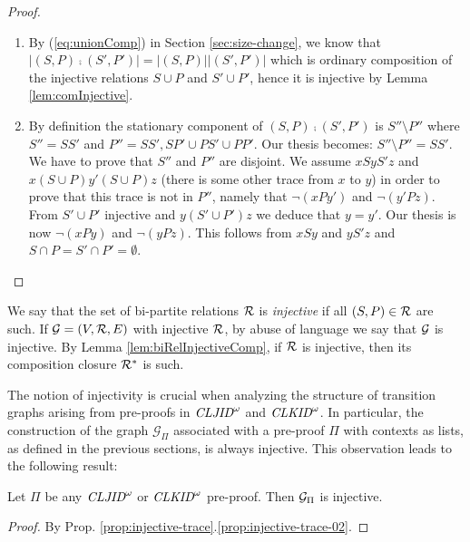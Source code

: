 \begin{proof}
\begin{enumerate}
\item
By (\ref{eq:unionComp}) in Section \ref{sec:size-change},  we know that $|(S,P) \comp (S',P')| =  |(S,P)| |(S',P')|$ which is ordinary composition of the injective relations $S \cup P$ and $S' \cup P'$, hence it is injective by Lemma \ref{lem:comInjective}.

\item
By definition the stationary component of $(S,P) \comp (S',P')$ is $S'' \setminus P''$
where $S'' =S S'$ and $P'' = SS', SP' \cup PS' \cup PP'$. Our thesis becomes:
$S'' \setminus P'' = S S'$. We have to prove that $S''$ and $P''$ are disjoint. 
We assume $xSyS'z$ and $x (S \cup P) y' (S \cup P) z$ 
(there is some other trace from $x$ to $y$) 
in order to prove that this trace is not in $P''$, namely that
$\neg (x P  y')$ and $\neg (y' P  z)$.  From $S' \cup P'$ injective and $y (S' \cup P') z$
we deduce that $y = y'$. Our thesis is now $\neg (x P  y)$ and $\neg (y P  z)$.
This follows from $xSy$ and $yS'z$ and $S \cap P = S' \cap P' = \emptyset$.
\end{enumerate}
\end{proof}


We say that the set of bi-partite relations $\mathcal{R}$ is {\em injective} if all $(S,P) \in \mathcal{R}$ are such. If $\mathcal{G} = (V, \mathcal{R}, E)$ with injective $\mathcal{R}$, by abuse of language we say that $\mathcal{G}$ is injective. By Lemma \ref{lem:biRelInjectiveComp}, if $\mathcal{R}$ is injective, then its composition closure $\mathcal{R}^*$ is such. 

The notion of injectivity is crucial when analyzing the structure of transition graphs arising from pre-proofs in $\textit{CLJID}^\omega$ and $\textit{CLKID}^\omega$. In particular, the construction of the graph $\mathcal{G}_{\Pi}$ associated with a pre-proof $\Pi$ with contexts as lists, as defined in the previous sections, is always injective. 
This observation leads to the following result:

\begin{theorem}\label{thr:injective-pre-proofs}
Let $\Pi$ be any $\textit{CLJID}^\omega$ or $\textit{CLKID}^\omega$ pre-proof. 
Then $\mathcal{G}_\Pi$ is injective.
\end{theorem}

\begin{proof}
By Prop. \ref{prop:injective-trace}.\ref{prop:injective-trace-02}.
\end{proof}

